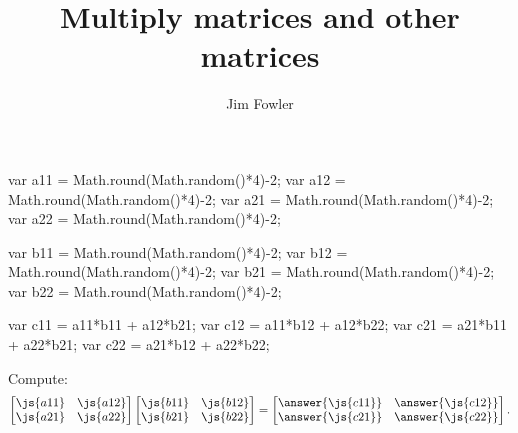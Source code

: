 \documentclass{ximera}
\title{Multiply matrices and other matrices}
\author{Jim Fowler}
\begin{document}
\begin{javascript}
  var a11 = Math.round(Math.random()*4)-2;
  var a12 = Math.round(Math.random()*4)-2;
  var a21 = Math.round(Math.random()*4)-2;
  var a22 = Math.round(Math.random()*4)-2;

  var b11 = Math.round(Math.random()*4)-2;
  var b12 = Math.round(Math.random()*4)-2;
  var b21 = Math.round(Math.random()*4)-2;
  var b22 = Math.round(Math.random()*4)-2;

  var c11 = a11*b11 + a12*b21;
  var c12 = a11*b12 + a12*b22;
  var c21 = a21*b11 + a22*b21;
  var c22 = a21*b12 + a22*b22;
\end{javascript}

\begin{problem}
  Compute:
  \[
    \begin{bmatrix}
      \js{a11} & \js{a12} \\
      \js{a21} & \js{a22}
    \end{bmatrix}
    \begin{bmatrix}
      \js{b11} & \js{b12} \\
      \js{b21} & \js{b22}
    \end{bmatrix} =
    \begin{bmatrix}
      \answer{\js{c11}} & \answer{\js{c12}} \\
      \answer{\js{c21}} & \answer{\js{c22}}
    \end{bmatrix}.    
  \]
\end{problem}
\end{document}
